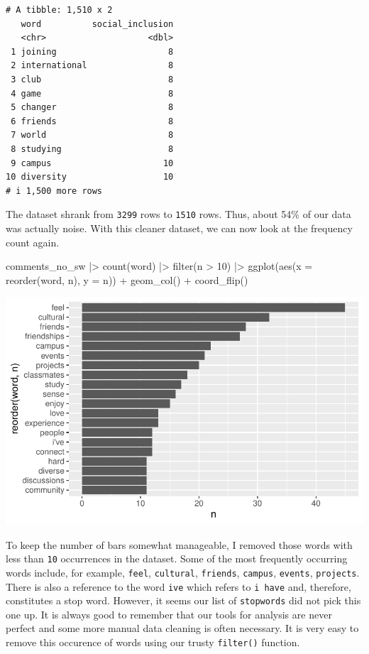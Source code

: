 \documentclass[
  letterpaper,
]{krantz}
\makeatletter
\newenvironment{Shaded}{\begin{snugshade}}{\end{snugshade}}
\newcommand{\AttributeTok}[1]{\textcolor[rgb]{0.40,0.45,0.13}{#1}}
\newcommand{\DecValTok}[1]{\textcolor[rgb]{0.68,0.00,0.00}{#1}}
\newcommand{\FunctionTok}[1]{\textcolor[rgb]{0.28,0.35,0.67}{#1}}
\newcommand{\NormalTok}[1]{\textcolor[rgb]{0.00,0.23,0.31}{#1}}
\newcommand{\SpecialCharTok}[1]{\textcolor[rgb]{0.37,0.37,0.37}{#1}}
\newenvironment{kframe}{%
\medskip{}
\setlength{\fboxsep}{.8em}
 \def\at@end@of@kframe{}%
 \ifinner\ifhmode%
  \def\at@end@of@kframe{\end{minipage}}%
  \begin{minipage}{\columnwidth}%
 \fi\fi%
 \def\FrameCommand##1{\hskip\@totalleftmargin \hskip-\fboxsep
 \colorbox{shadecolor}{##1}\hskip-\fboxsep
     \hskip-\linewidth \hskip-\@totalleftmargin \hskip\columnwidth}%
 \MakeFramed {\advance\hsize-\width
   \@totalleftmargin\z@ \linewidth\hsize
   \@setminipage}}%
 {\par\unskip\endMakeFramed%
 \at@end@of@kframe}
\renewenvironment{Shaded}{\begin{kframe}}{\end{kframe}}
\makeatother
\begin{document}
\begin{verbatim}
# A tibble: 1,510 x 2
   word          social_inclusion
   <chr>                    <dbl>
 1 joining                      8
 2 international                8
 3 club                         8
 4 game                         8
 5 changer                      8
 6 friends                      8
 7 world                        8
 8 studying                     8
 9 campus                      10
10 diversity                   10
# i 1,500 more rows
\end{verbatim}

The dataset shrank from \texttt{3299} rows to \texttt{1510} rows. Thus,
about 54\% of our data was actually noise. With this cleaner dataset, we
can now look at the frequency count again.

\begin{Shaded}
\begin{Highlighting}[]
\NormalTok{comments\_no\_sw }\SpecialCharTok{|\textgreater{}}
  \FunctionTok{count}\NormalTok{(word) }\SpecialCharTok{|\textgreater{}}
  \FunctionTok{filter}\NormalTok{(n }\SpecialCharTok{\textgreater{}} \DecValTok{10}\NormalTok{) }\SpecialCharTok{|\textgreater{}}
  \FunctionTok{ggplot}\NormalTok{(}\FunctionTok{aes}\NormalTok{(}\AttributeTok{x =} \FunctionTok{reorder}\NormalTok{(word, n),}
             \AttributeTok{y =}\NormalTok{ n)) }\SpecialCharTok{+}
  \FunctionTok{geom\_col}\NormalTok{() }\SpecialCharTok{+}
  \FunctionTok{coord\_flip}\NormalTok{()}
\end{Highlighting}
\end{Shaded}

\includegraphics{14_mixed_methods_files/figure-pdf/freq-after-stopwords-removal-1.pdf}

To keep the number of bars somewhat manageable, I removed those words
with less than \texttt{10} occurrences in the dataset. Some of the most
frequently occurring words include, for example, \texttt{feel},
\texttt{cultural}, \texttt{friends}, \texttt{campus}, \texttt{events},
\texttt{projects}. There is also a reference to the word
\texttt{i\textquotesingle{}ve} which refers to \texttt{i\ have} and,
therefore, constitutes a stop word. However, it seems our list of
\texttt{stopwords} did not pick this one up. It is always good to
remember that our tools for analysis are never perfect and some more
manual data cleaning is often necessary. It is very easy to remove this
occurence of words using our trusty \texttt{filter()} function.
\end{document}
